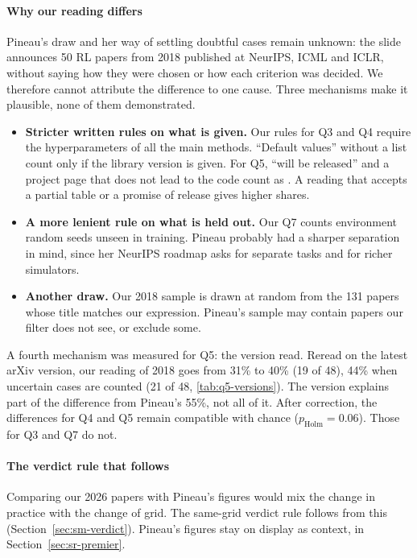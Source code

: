 \paragraph{Why our reading differs}
Pineau's draw and her way of settling doubtful cases remain unknown: the slide announces 50 RL papers
from 2018 published at NeurIPS, ICML and ICLR, without saying how they were chosen or how each
criterion was decided. We therefore cannot attribute the difference to one cause. Three mechanisms make
it plausible, none of them demonstrated.
\begin{itemize}
  \item \textbf{Stricter written rules on what is given.} Our rules for Q3 and Q4 require the
  hyperparameters of all the main methods. \enquote{Default values} without a list count only if the
  library version is given. For Q5, \enquote{will be released} and a project page that does not lead
  to the code count as . A reading that accepts a partial table or a promise of release gives
  higher shares.
  \item \textbf{A more lenient rule on what is held out.} Our Q7 counts environment random seeds unseen
  in training. Pineau probably had a sharper separation in mind, since her NeurIPS roadmap asks for
  separate tasks and for richer simulators.
  \item \textbf{Another draw.} Our 2018 sample is drawn at random from the 131 papers whose title
  matches our expression. Pineau's sample may contain papers our filter does not see, or exclude
  some.
\end{itemize}
A fourth mechanism was measured for Q5: the version read. Reread on the latest arXiv version, our reading of
2018 goes from 31\% to 40\% (19 of 48), 44\% when uncertain cases are counted (21 of 48,
\cref{tab:q5-versions}). The version explains part of the difference from Pineau's 55\%, not all of it. After
correction, the differences for Q4 and Q5 remain compatible with chance ($p_{\text{Holm}} = 0.06$). Those for Q3 and
Q7 do not.

\paragraph{The verdict rule that follows}
Comparing our 2026 papers with Pineau's figures would mix the change in practice with the change of
grid. The same-grid verdict rule follows from this (Section~\ref{sec:sm-verdict}). Pineau's figures
stay on display as context, in Section~\ref{sec:sr-premier}.

